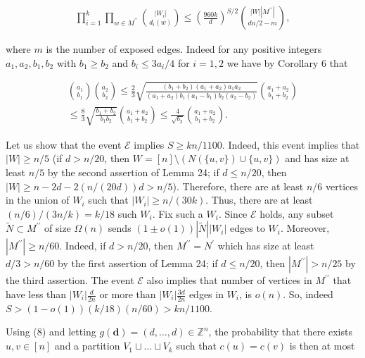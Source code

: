 \[\begin{gathered}
\prod_{i=1}^{k}\prod_{w\in M^{\prime\prime}}\binom{|W_{i}|}{d_{i}(w)}\leq\left(\frac{960k}{d}\right)^{S/2}\binom{|W||M^{\prime\prime}|}{dn/2-m},
\end{gathered}\]


where $m$ is the number of exposed edges.
Indeed for any positive integers $a_{1},a_{2},b_{1},b_{2}$ with $b_{1}\geq b_{2}$ and $b_{i}\leq 3a_{i}/4$ for $i=1,2$ we have by Corollary 6 that\par


\[\begin{gathered}
\displaystyle\binom{a_{1}}{b_{1}}\binom{a_{2}}{b_{2}} \displaystyle\leq\frac{2}{3}\sqrt{\frac{(b_{1}+b_{2})(a_{1}+a_{2})a_{1}a_{2}}{(a_{1}+a_{2})b_{1}(a_{1}-b_{1})b_{2}(a_{2}-b_{2})}}\binom{a_{1}+a_{2}}{b_{1}+b_{2}} \\
\displaystyle\leq\frac{8}{3}\sqrt{\frac{b_{1}+b_{2}}{b_{1}b_{2}}}\binom{a_{1}+a_{2}}{b_{1}+b_{2}}\leq{\frac{4}{\sqrt{b_{2}}}}\binom{a_{1}+a_{2}}{b_{1}+b_{2}}.
\end{gathered}\]




Let us show that the event $\mathcal{E}$ implies $S\geq kn/1100$. Indeed, this event implies that $|W|\geq n/5$ (if $d>n/20$, then $W=[n]\setminus(N(\{u,v\})\cup\{u,v\})$ and has size at least $n/5$ by the second assertion of Lemma 24; if $d\leq n/20$, then $|W|\geq n-2d-2(n/(20d))d>n/5$). Therefore, there are at least $n/6$ vertices in the union of $W_{i}$ such that $|W_{i}|\geq n/(30k)$. Thus, there are at least $(n/6)/(3n/k)=k/18$ such $W_{i}$. Fix such a $W_{i}$. Since $\mathcal{E}$ holds, any subset $\tilde{N}\subset M^{\prime\prime}$ of size $\Omega(n)$ sends $(1\pm o(1))|\tilde{N}||W_{i}|$ edges to $W_{i}$. Moreover, $|M^{\prime\prime}|\geq n/60$. Indeed, if $d>n/20$, then $M^{\prime\prime}=N^{\prime}$ which has size at least $d/3>n/60$ by the first assertion of Lemma 24; if $d\leq n/20$, then $|M^{\prime\prime}|>n/25$ by the third assertion. The event $\mathcal{E}$ also implies that number of vertices in $M^{\prime\prime}$ that have less than $|W_{i}|\frac{d}{2n}$ or more than $|W_{i}|\frac{3d}{2n}$ edges in $W_{i}$, is $o(n)$. So, indeed $S>(1-o(1))(k/18)(n/60)>kn/1100$.\par




Using (8) and letting $g(\mathbf{d})=(d,\ldots,d)\in\mathbb{Z}^{n}$, the probability that there exists $u,v\in[n]$ and a partition $V_{1}\sqcup\ldots\sqcup V_{k}$ such that $c(u)=c(v)$ is then at most\par


